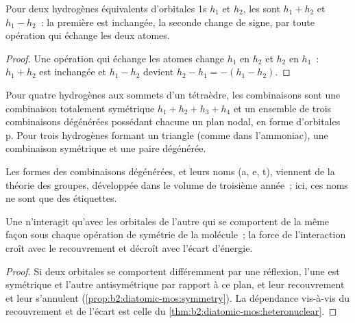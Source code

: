 \begin{proposition}\label{prop:b2:fragment-orbitals:h2-pair}
Pour deux hydrogènes équivalents d'orbitales 1s $h_1$ et $h_2$, les
 sont $h_1 + h_2$ et $h_1 - h_2$~: la première est
inchangée, la seconde change de signe, par toute opération qui échange les deux
atomes.
\end{proposition}

\begin{proof}
Une opération qui échange les atomes change $h_1$ en $h_2$ et $h_2$ en
$h_1$~: $h_1 + h_2$ est inchangée et $h_1 - h_2$ devient $h_2 - h_1 = -(h_1 - h_2)$.
\end{proof}

\begin{proposition}\label{prop:b2:fragment-orbitals:h4}
Pour quatre hydrogènes aux sommets d'un tétraèdre, les combinaisons sont une
combinaison totalement symétrique $h_1 + h_2 + h_3 + h_4$ et un ensemble de trois combinaisons
dégénérées possédant chacune un plan nodal, en forme d'orbitales p. Pour trois
hydrogènes formant un triangle (comme dans l'ammoniac), une combinaison symétrique et une
paire dégénérée.
\end{proposition}

\admitted

Les formes des combinaisons dégénérées, et leurs noms (a, e, t), viennent de la théorie
des groupes, développée dans le volume de troisième année~; ici, ces noms ne sont que des étiquettes.

\begin{proposition}\label{prop:b2:fragment-orbitals:interaction-rules}
Une  n'interagit qu'avec les orbitales de l'autre  qui
se comportent de la même façon sous chaque opération de symétrie de la molécule~; la
force de l'interaction croît avec le recouvrement et décroît avec l'écart
d'énergie.
\end{proposition}

\begin{proof}
Si deux orbitales se comportent différemment par une réflexion, l'une est symétrique et
l'autre antisymétrique par rapport à ce plan, et leur recouvrement et leur  s'annulent (\cref{prop:b2:diatomic-mos:symmetry}). La dépendance vis-à-vis du
recouvrement et de l'écart est celle du \cref{thm:b2:diatomic-mos:heteronuclear}.
\end{proof}

